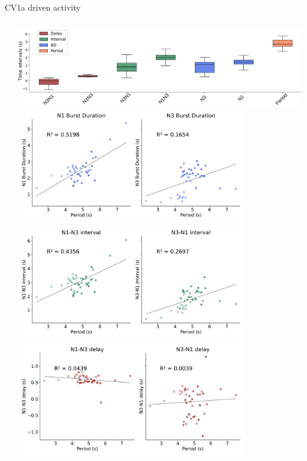 \documentclass[aspectratio=43]{beamer}
\begin{document}
\begin{frame}{CV1a driven activity}
{\begin{columns}
\begin{column}{0.5\textwidth}
			\end{column}
			\begin{column}{0.5\textwidth}
				\includegraphics[width=\textwidth]{invariants/data/SUSSEX/CV1a_driven2/images/_boxplot_h_fitted.pdf}
				\centering
				\includegraphics[width=0.8\textwidth]{invariants/data/SUSSEX/CV1a_driven2/images/_durations.pdf}	\includegraphics[width=0.8\textwidth]{invariants/data/SUSSEX/CV1a_driven2/images/_intervals.pdf}	\includegraphics[width=0.8\textwidth]{invariants/data/SUSSEX/CV1a_driven2/images/_delays.pdf}	
				
			\end{column}
		\end{columns}
	}	
	
\end{frame}
\end{document}
